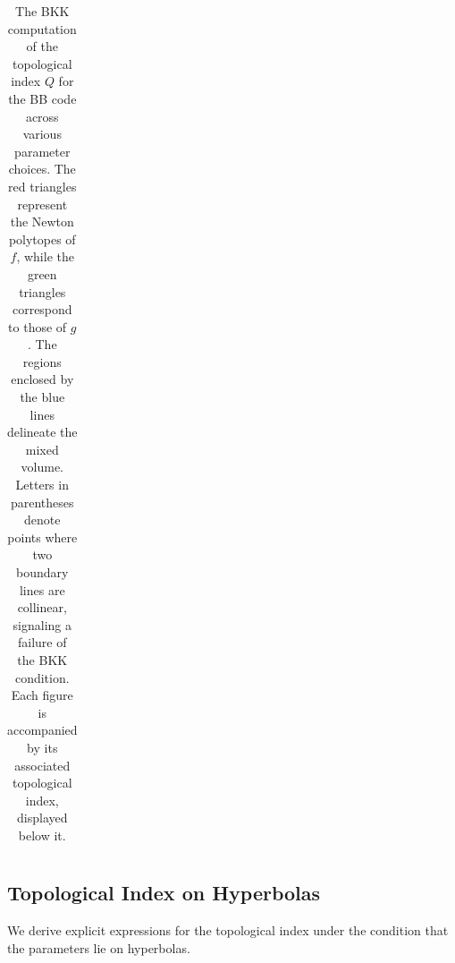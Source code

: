 \documentclass[aps,prl,english,superscriptaddress,twocolumn,tightenlines,showpacs,longbibliography,floatfix,amsfonts]{revtex4-2}
\begin{document}
\begin{table}
\begin{tabular}{cccc}
		\toprule[1.5pt]
	\end{tabular}
	\caption{The BKK computation of the topological index $Q$ for the BB code across various parameter choices. The red triangles represent the Newton polytopes of $f$, while the green triangles correspond to those of $g$. The regions enclosed by the blue lines delineate the mixed volume. Letters in parentheses denote points where two boundary lines are collinear, signaling a failure of the BKK condition. Each figure is accompanied by its associated topological index, displayed below it.}\label{table:newton_polytope}
\end{table}

\subsection{Topological Index on Hyperbolas}
We derive explicit expressions for the topological index under the condition that the parameters lie on hyperbolas. 
\end{document}

